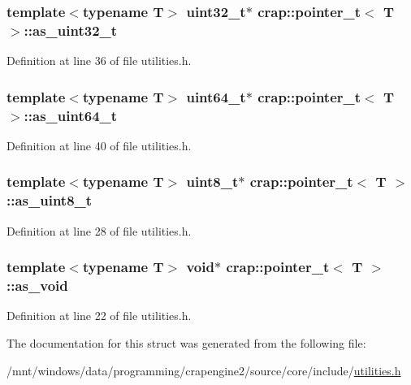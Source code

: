 \subsubsection[{as\+\_\+uint32\+\_\+t}]{\setlength{\rightskip}{0pt plus 5cm}template$<$typename T$>$ uint32\+\_\+t$\ast$ {\bf crap\+::pointer\+\_\+t}$<$ T $>$\+::as\+\_\+uint32\+\_\+t}\label{structcrap_1_1pointer__t_adf2f1a4f92a44f4899bab5d1743e0b0b}


Definition at line 36 of file utilities.\+h.

\hypertarget{structcrap_1_1pointer__t_a7e0460a4477f27ab4fc4279e8ed360ce}{}
\subsubsection[{as\+\_\+uint64\+\_\+t}]{\setlength{\rightskip}{0pt plus 5cm}template$<$typename T$>$ uint64\+\_\+t$\ast$ {\bf crap\+::pointer\+\_\+t}$<$ T $>$\+::as\+\_\+uint64\+\_\+t}\label{structcrap_1_1pointer__t_a7e0460a4477f27ab4fc4279e8ed360ce}


Definition at line 40 of file utilities.\+h.

\hypertarget{structcrap_1_1pointer__t_abc75378cf1e3c1cb65e93c1a765a5c0b}{}
\subsubsection[{as\+\_\+uint8\+\_\+t}]{\setlength{\rightskip}{0pt plus 5cm}template$<$typename T$>$ uint8\+\_\+t$\ast$ {\bf crap\+::pointer\+\_\+t}$<$ T $>$\+::as\+\_\+uint8\+\_\+t}\label{structcrap_1_1pointer__t_abc75378cf1e3c1cb65e93c1a765a5c0b}


Definition at line 28 of file utilities.\+h.

\hypertarget{structcrap_1_1pointer__t_a60272c75c04aaafaf6a4339f10d81b32}{}
\subsubsection[{as\+\_\+void}]{\setlength{\rightskip}{0pt plus 5cm}template$<$typename T$>$ void$\ast$ {\bf crap\+::pointer\+\_\+t}$<$ T $>$\+::as\+\_\+void}\label{structcrap_1_1pointer__t_a60272c75c04aaafaf6a4339f10d81b32}


Definition at line 22 of file utilities.\+h.



The documentation for this struct was generated from the following file\+:\begin{DoxyCompactItemize}
\item 
/mnt/windows/data/programming/crapengine2/source/core/include/\hyperlink{utilities_8h}{utilities.\+h}\end{DoxyCompactItemize}
